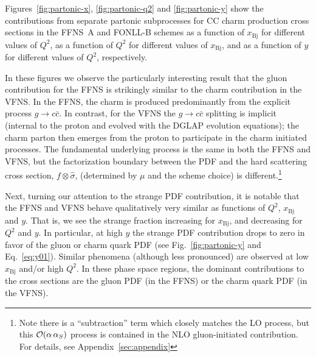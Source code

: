 \documentclass[pdftex,twocolumn,epjc3]{svjour3}          %
\newcommand{\xbj}{\ensuremath{x_{\text{Bj}}}\xspace}
\newcommand{\fonll} {{FONLL-B}\xspace}
\newcommand{\ffns} {{FFNS~A}\xspace}
\begin{document}
Figures~\ref{fig:partonic-x}, \ref{fig:partonic-q2} and
\ref{fig:partonic-y} show the contributions from separate partonic
subprocesses for CC charm production cross sections in the \ffns and
\fonll schemes
 as a function of \xbj for different values of $Q^2$,
 as a function of $Q^2$ for different values of \xbj,
 and as a function of $y$ for different values of $Q^2$, respectively.


 
\color{blue} %
%
In these figures 
we observe the  particularly interesting result that  
the gluon contribution for the FFNS  is strikingly similar to the charm contribution 
in the VFNS. 
%
In the FFNS, the charm is produced  predominantly from the explicit process $g \to c\bar{c}$. 
In contrast, for the VFNS the  $g\to c\bar{c}$ splitting is implicit (internal to the proton and evolved 
with the DGLAP evolution equations); the charm parton then emerges from the proton
to participate in the charm initiated processes. 
%
The fundamental underlying process is the same in both the FFNS and VFNS, but 
the factorization boundary between the PDF and the hard scattering cross section, 
$f \otimes \hat{\sigma}$,  
(determined by $\mu$ and the scheme choice) is 
different.\footnote{Note 
there is a ``subtraction'' term  which closely 
matches the LO  process, but this ${\cal O}(\alpha \, \alpha_S)$  process is contained in the NLO gluon-initiated contribution.
For details, see Appendix~\ref{sec:appendix}
}



\color{black} %

Next, turning our attention to the strange PDF contribution,
it is notable that the FFNS and VFNS behave qualitatively very similar
as   functions of $Q^2$, \xbj and $y$.
That is, we see the strange fraction increasing for \xbj, and decreasing for  $Q^2$ and $y$.
%
In particular, at high $y$ the strange PDF contribution drops to zero
in favor of the gluon or charm quark PDF (see
Fig.~\ref{fig:partonic-y} and Eq.~\ref{eq:y01}). Similar phenomena
(although less pronounced) are observed at low \xbj and/or high
$Q^2$. In these phase space regions, the dominant contributions to the
cross sections are the gluon PDF (in the FFNS) or the charm quark PDF
(in the VFNS).
\end{document}
